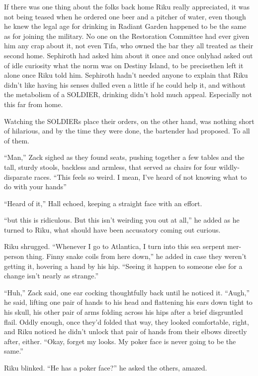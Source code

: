 If there was one thing about the folks back home Riku really appreciated, it was not being teased when he ordered one beer and a pitcher of water, even though he knew the legal age for drinking in Radiant Garden happened to be the same as for joining the military. No one on the Restoration Committee had ever given him any crap about it, not even Tifa, who owned the bar they all treated as their second home. Sephiroth had asked him about it once and once only\textemdash had asked out of idle curiosity what the norm was on Destiny Island, to be precise\textemdash then left it alone once Riku told him. Sephiroth hadn't needed anyone to explain that Riku didn't like having his senses dulled even a little if he could help it, and without the metabolism of a SOLDIER, drinking didn't hold much appeal. Especially not this far from home.

Watching the SOLDIERs place their orders, on the other hand, was nothing short of hilarious, and by the time they were done, the bartender had proposed. To all of them.

``Man,'' Zack sighed as they found seats, pushing together a few tables and the tall, sturdy stools, backless and armless, that served as chairs for four wildly-disparate races. ``This feels so weird. I mean, I've heard of not knowing what to do with your hands\textemdash''

``Heard of it,'' Hall echoed, keeping a straight face with an effort.

``\textemdash but this is ridiculous. But this isn't weirding you out at all,'' he added as he turned to Riku, what should have been accusatory coming out curious.

Riku shrugged. ``Whenever I go to Atlantica, I turn into this sea serpent mer-person thing. Finny snake coils from here down,'' he added in case they weren't getting it, hovering a hand by his hip. ``Seeing it happen to someone else for a change isn't nearly as strange.''

``Huh,'' Zack said, one ear cocking thoughtfully back until he noticed it. ``Augh,'' he said, lifting one pair of hands to his head and flattening his ears down tight to his skull, his other pair of arms folding across his hips after a brief disgruntled flail. Oddly enough, once they'd folded that way, they looked comfortable, right, and Riku noticed he didn't unlock that pair of hands from their elbows directly after, either. ``Okay, forget my looks. My poker face is never going to be the same.''

Riku blinked. ``He has a poker face?'' he asked the others, amazed.

